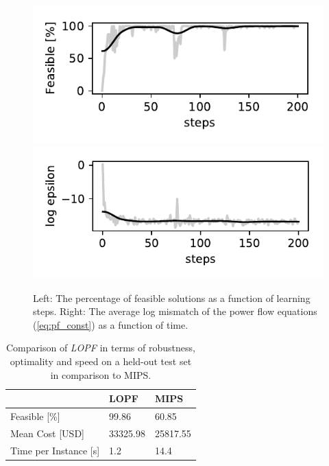 \begin{figure}[!ht]
    \centering
    \includegraphics[width=0.48\linewidth]{krtofl/violation_percentage.pdf}
    \includegraphics[width=0.48\linewidth]{krtofl/epsilon_epoch.pdf}
    \caption[LOPF: Error and feasibility as a function of learning steps.]{Left: The percentage of feasible solutions as a function of learning steps. Right: The average log mismatch of the power flow equations (\ref{eq:pf_const}) as a function of time.}
    \label{lopf:violations}
\end{figure}

\begin{table}[]
\centering
\large
\begin{tabular}{| l | l | l |}
\hline
          & LOPF & MIPS   \\
          \hline
Feasible [\%] & 99.86  & 60.85 \\
Mean Cost [USD] & 33325.98 & 25817.55\\
Time per Instance [s] & 1.2 & 14.4\\
\hline
\end{tabular}
\caption[LOPF: Performance comparison]{Comparison of \emph{LOPF} in terms of robustness, optimality and speed on a held-out test set in comparison to MIPS.}
\label{lopf:res_table}
\end{table}

